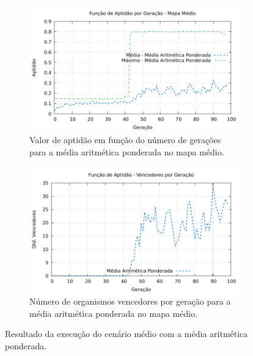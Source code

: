 \begin{figure}[H]
\centering
	\begin{subfigure}[b]{0.4\textwidth}
        \includegraphics[width=\textwidth]{fig/medium-wam-fitness-experiment.pdf}
        \caption{Valor de aptidão em função do número de gerações para a média
        aritmética ponderada no mapa médio.}
	\end{subfigure}
	\begin{subfigure}[b]{0.4\textwidth}
        \includegraphics[width=\textwidth]{fig/medium-wam-winners-experiment.pdf}
        \caption{Número de organismos vencedores por geração para a média
        aritmética ponderada no mapa médio.}
	\end{subfigure}

    \caption{Resultado da execução do cenário médio com a média aritmética
    ponderada.}
	\label{fig:medium-wam-experiment}
\end{figure}


